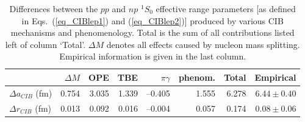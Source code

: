 \pagebreak


\begin{table}
\caption{Differences between the $pp$ and $np$ $^1S_0$ effective 
range parameters [as defined in 
Eqs.~(\ref{eq_CIBlep1})
and (\ref{eq_CIBlep2})]
produced by various CIB mechanisms and phenomenology.
Total is the sum of all contributions listed left of column `Total'.
$\Delta M$ denotes all effects caused by nucleon mass splitting.
Empirical information is given in the last column.}
\begin{tabular}{lrrrrrrr}
                   
 & $\Delta M$
 & OPE
 & TBE 
 & $\pi\gamma$
 & phenom.
 & Total 
 & Empirical
\\
\hline                                                                          
$\Delta a_{CIB}$ (fm)& 0.754 & 3.035 & 1.339 & --0.405 & 1.555 & 6.278 
 & $6.44 \pm 0.40$ \\
$\Delta r_{CIB}$ (fm)& 0.013 & 0.092 & 0.016 & --0.004 & 0.057 & 0.174 
 & $0.08 \pm 0.06$ \\
\end{tabular}
\label{tab_CIBlep}
\end{table}



\vspace*{6cm}


